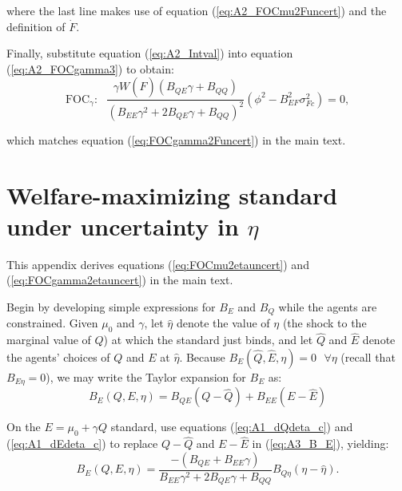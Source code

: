 \documentclass[12pt]{article}
\begin{document}
where the last line makes use of equation (\ref{eq:A2_FOCmu2Funcert}) and the definition of $\dot{F}$.

Finally, substitute equation (\ref{eq:A2_Intval}) into equation (\ref{eq:A2_FOCgamma3}) to obtain:
\begin{equation}
\text{FOC}_{\gamma}: \text{ } \frac{\gamma W(\hat{F})(B_{QE}\gamma+B_{QQ})}{(B_{EE}\gamma^2+2B_{QE}\gamma+B_{QQ})^2}(\phi^2-B_{EF}^2\sigma_{Fc}^2) = 0,
\end{equation}

which matches equation (\ref{eq:FOCgamma2Funcert}) in the main text.


\section{Welfare-maximizing standard under uncertainty in $\eta$} \label{appx:etauncert}

This appendix derives equations (\ref{eq:FOCmu2etauncert}) and (\ref{eq:FOCgamma2etauncert}) in the main text.

Begin by developing simple expressions for $B_E$ and $B_Q$ while the agents are constrained. Given $\mu_0$ and $\gamma$, let $\hat{\eta}$ denote the value of $\eta$ (the shock to the marginal value of $Q$) at which the standard just binds, and let $\hat{Q}$ and $\hat{E}$ denote the agents' choices of $Q$ and $E$ at $\hat{\eta}$. Because $B_E(\hat{Q},\hat{E},\eta)=0 \text{ }\forall \eta$ (recall that $B_{E\eta}=0$), we may write the Taylor expansion for $B_E$ as:
\begin{equation}
B_E(Q,E,\eta)=B_{QE}(Q-\hat{Q})+B_{EE}(E-\hat{E}) \label{eq:A3_B_E}
\end{equation}

On the $E=\mu_0+\gamma Q$ standard, use equations (\ref{eq:A1_dQdeta_c}) and (\ref{eq:A1_dEdeta_c}) to replace $Q-\hat{Q}$ and $E-\hat{E}$ in (\ref{eq:A3_B_E}), yielding:
\begin{equation}
B_E(Q,E,\eta)=\frac{-(B_{QE}+B_{EE}\gamma)}{B_{EE}\gamma^2+2B_{QE}\gamma+B_{QQ}}B_{Q\eta}(\eta-\hat{\eta}). \label{eq:A3_B_E_long}
\end{equation}
\end{document}
